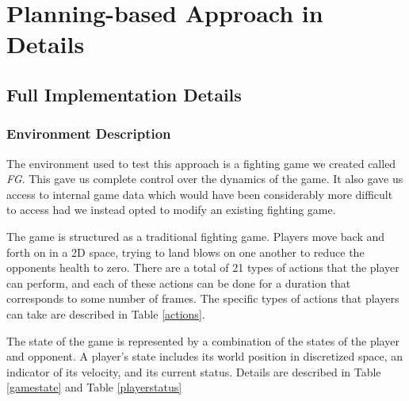 
\chapter{Planning-based Approach in Details}

\label{Chapter4} %

\section{Full Implementation Details}

\subsection{Environment Description}
The environment used to test this approach is a fighting game we created called \textit{FG}. This gave us complete control over the dynamics of the game. It also gave us access to internal game data which would have been considerably more difficult to access had we instead opted to modify an existing fighting game. 

The game is structured as a traditional fighting game. Players move back and forth on in a 2D space, trying to land blows on one another to reduce the opponents health to zero. There are a total of 21 types of actions that the player can perform, and each of these actions can be done for a duration that corresponds to some number of frames. The specific types of actions that players can take are described in Table \ref{actions}.

The state of the game is represented by a combination of the states of the player and opponent. A player's state includes its world position in discretized space, an indicator of its velocity, and its current status. Details are described in Table \ref{gamestate} and Table \ref{playerstatus}








